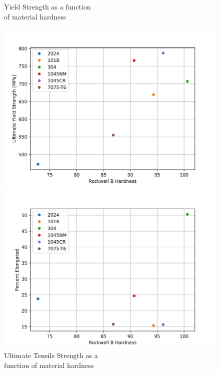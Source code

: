 \documentclass{article}
\begin{document}
\begin{figure}[!h!]
\begin{minipage}[b]{0.5\linewidth}
    \caption{Yield Strength as a function \\ of material hardness} 
    \vspace{4ex}
  \end{minipage} 
  \begin{minipage}[b]{0.5\linewidth}
    \centering
    \includegraphics[width=\linewidth]{plots/q3_uts.png} 
    \caption{Ultimate Tensile Strength as a \\ function of material hardness} 
    \vspace{4ex}
  \end{minipage}
  \begin{minipage}[b]{0.5\linewidth}
    \centering
    \includegraphics[width=\linewidth]{plots/q3_perelong.png} 

\end{minipage}
\end{figure}
\end{document}

